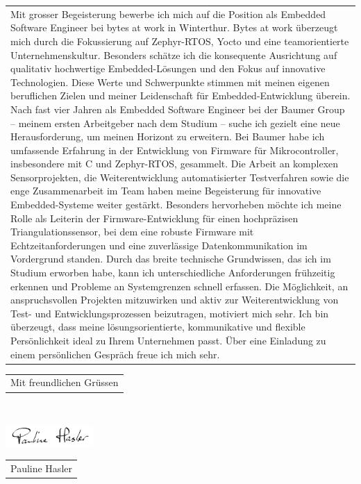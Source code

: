 \documentclass[11pt,A4,german]{article}
\newcommand{\mpwidth}{\linewidth-\fboxsep-\fboxsep}
\newcommand{\cvtext}[1] {
  \begin{tabular*}{1\mpwidth}{p{0.98\mpwidth}}
    \parbox{1\mpwidth}{#1}
  \end{tabular*}
}
\begin{document}
\cvtext{Mit grosser Begeisterung bewerbe ich mich auf die Position als Embedded Software Engineer bei bytes at work in Winterthur. Bytes at work überzeugt mich durch die Fokussierung auf Zephyr-RTOS, Yocto und eine teamorientierte Unternehmenskultur. Besonders schätze ich die konsequente Ausrichtung auf qualitativ hochwertige Embedded-Lösungen und den Fokus auf innovative Technologien.
\newline
\newline
Diese Werte und Schwerpunkte stimmen mit meinen eigenen beruflichen Zielen und meiner Leidenschaft für Embedded-Entwicklung überein.
\newline
\newline
Nach fast vier Jahren als Embedded Software Engineer bei der Baumer Group – meinem ersten Arbeitgeber nach dem Studium – suche ich gezielt eine neue Herausforderung, um meinen Horizont zu erweitern.
\newline
\newline
Bei Baumer habe ich umfassende Erfahrung in der Entwicklung von Firmware für Mikrocontroller, insbesondere mit C und Zephyr-RTOS, gesammelt. Die Arbeit an komplexen Sensorprojekten, die Weiterentwicklung automatisierter Testverfahren sowie die enge Zusammenarbeit im Team haben meine Begeisterung für innovative Embedded-Systeme weiter gestärkt. Besonders hervorheben möchte ich meine Rolle als Leiterin der Firmware-Entwicklung für einen hochpräzisen Triangulationssensor, bei dem eine robuste Firmware mit Echtzeitanforderungen und eine zuverlässige Datenkommunikation im Vordergrund standen.
\newline
Durch das breite technische Grundwissen, das ich im Studium erworben habe, kann ich unterschiedliche Anforderungen frühzeitig erkennen und Probleme an Systemgrenzen schnell erfassen.
\newline
\newline
Die Möglichkeit, an anspruchsvollen Projekten mitzuwirken und aktiv zur Weiterentwicklung von Test- und Entwicklungsprozessen beizutragen, motiviert mich sehr. Ich bin überzeugt, dass meine lösungsorientierte, kommunikative und flexible Persönlichkeit ideal zu Ihrem Unternehmen passt.
\newline
\newline
Über eine Einladung zu einem persönlichen Gespräch freue ich mich sehr.
\newline
\newline
}



\cvtext{Mit freundlichen Grüssen}\\[20pt]

\begin{flushleft}
    \includegraphics[width=0.25\textwidth]{../resources/Signature.jpg}
\end{flushleft}
\cvtext{\vspace{-35pt}\hspace{10pt}Pauline Hasler}
\end{document}
